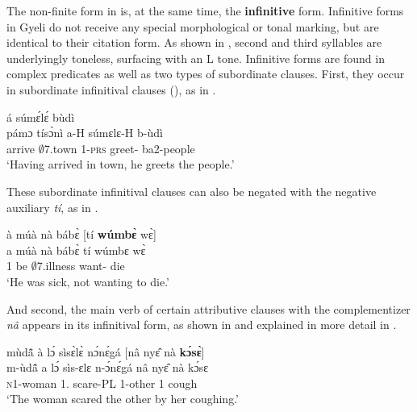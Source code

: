 
The non-finite form in  is, at the same time, the {\bfseries infinitive} form. Infinitive forms in Gyeli do not receive any special morphological or tonal marking, but are identical to their citation form. As shown in , second and third syllables are underlyingly toneless, surfacing with an L tone. Infinitive forms are found in complex predicates  as well as two types of subordinate clauses. First, they occur in subordinate infinitival clauses (), as in .

\ea \label{INFPred1}
  \glll    [{\bfseries pámɔ̀} tísɔ̀nì]\textsubscript{{\INF}} á súmɛ́lɛ́ bùdì \\
            {\db}pámɔ tísɔ̀nì a-H súmɛlɛ-H b-ùdì \\
             {\db}arrive $\emptyset$7.town 1-\textsc{prs} greet-{\R} ba2-people   \\
    \trans `Having arrived in town, he greets the people.'
\z

\noindent These subordinate infinitival clauses can also be negated with the negative auxiliary {\itshape tí}, as in .

\ea \label{INFPred2}
  \glll  à múà nà bábɛ̀ [tí {\bfseries wúmbɛ̀} wɛ̀] \\
          a múà nà bábɛ̀ {\db}tí wúmbɛ wɛ̀   \\
         1 be {\COM} $\emptyset$7.illness {\db}{\NEG} want-{\R} die \\
    \trans `He was sick, not wanting to die.'
\z


\noindent And second, the main verb of certain attributive clauses with the complementizer {\itshape nâ} appears in its infinitival form, as shown in  and explained in more detail in .

\ea \label{INFPred3}
  \glll mùdã̂ à lɔ́ sìsɛ̀lɛ̀ nɔ́nɛ́gá [nâ nyɛ̂ nà {\bfseries kɔ́sɛ̀}] \\
m-ùdã̂ a lɔ́ sìs-ɛlɛ n-ɔ́nɛ́gá {\db}nâ nyɛ̂ nà kɔ́sɛ \\
\textsc{n}1-woman 1.{\PST} {\RETRO} scare-{\AP}PL 1-other {\db}{\COMP} 1 {\COM} cough     \\
  \trans `The woman scared the other by her coughing.'
\z


